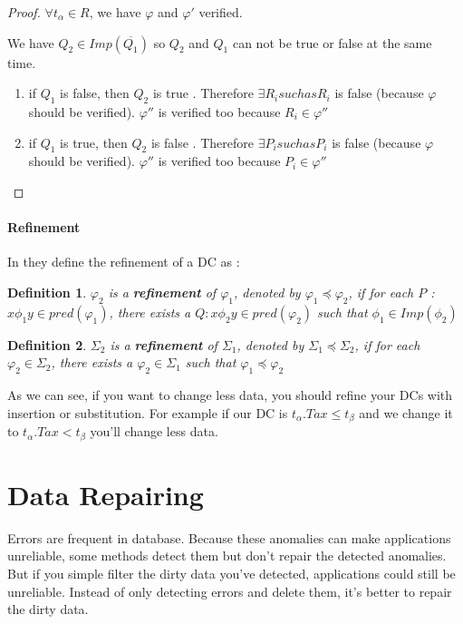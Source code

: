 \documentclass[letterpaper, 12pt]{report}
\newtheorem{mydef}{Definition}
\begin{document}
\begin{proof}
	$\forall t_\alpha \in R$, we have $\varphi$ and $\varphi '$ verified.
	
\hspace*{0.5cm}	We have $Q_2 \in Imp(\overline{Q_1})$ so $Q_2$ and $Q_1$ can not be true or false at the same time.
	\begin{enumerate}
	 \item if $Q_1$ is false, then $Q_2$ is true . Therefore $\exists R_i such as R_i$ is false (because $\varphi$ should be verified). $\varphi ''$ is verified too because $R_i \in \varphi ''$
	 \item if $Q_1$ is true, then $Q_2$ is false . Therefore $\exists P_i such as P_i$ is false (because $\varphi$ should be verified). $\varphi ''$ is verified too because $P_i \in \varphi ''$
	\end{enumerate}
\end{proof}

\subsubsection{Refinement}
\label{RefinementSection}
In \cite{main} they define the refinement of a DC as :

\begin{mydef}
 $\varphi_2$ is a \textbf{refinement} of $\varphi_1$, denoted by $\varphi_1 \preceq \varphi_2$, if for each $ P$ : $x\phi_1 y \in pred(\varphi_1)$, there exists a $Q : x \phi_2 y \in pred(\varphi_2)$ such that $\phi_1 \in Imp(\phi_2)$
\end{mydef}

\begin{mydef}
 $\Sigma_2$ is a \textbf{refinement} of $\Sigma_1$, denoted by $\Sigma_1 \preceq \Sigma_2$, if for each $ \varphi_2 \in \Sigma_2$, there exists a $\varphi_2 \in \Sigma_1$ such that $\varphi_1 \preceq \varphi_2$
\end{mydef}

As we can see, if you want to change less data, you should refine your DCs with insertion or substitution. For example if our DC is $t_\alpha.Tax \leq t_\beta$ and we change it to $t_\alpha.Tax < t_\beta$ you'll change less data.

\chapter{Data Repairing}

Errors are frequent in database. Because these anomalies can make applications unreliable, some methods detect them but don't repair the detected anomalies. But if you simple filter the dirty data you've detected, applications could still be unreliable. \cite{anodetect} Instead of only detecting errors and delete them, it's better to repair the dirty data.\\
\end{document}
